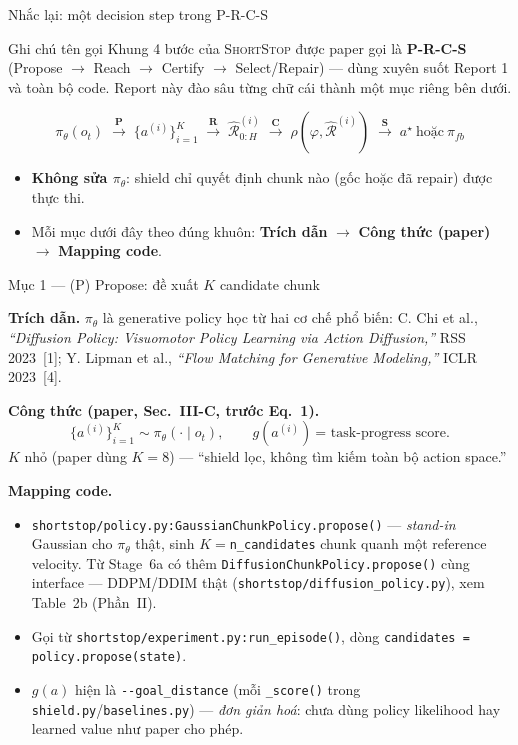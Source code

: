 \documentclass[aspectratio=169]{beamer}
\newcommand{\st}{\textsc{ShortStop}}
\begin{document}
\begin{frame}[t,shrink=8]{Nhắc lại: một decision step trong P-R-C-S}
\begin{block}{Ghi chú tên gọi}
Khung 4 bước của \st{} được paper gọi là \textbf{P-R-C-S} (Propose $\to$ Reach $\to$ Certify $\to$ Select/Repair) --- dùng xuyên suốt Report 1 và toàn bộ code. Report này đào sâu từng chữ cái thành một mục riêng bên dưới.
\end{block}
\vspace{4pt}
\begin{center}
\[
\pi_\theta(o_t)\;\xrightarrow{\textbf{P}}\;\{a^{(i)}\}_{i=1}^K\;\xrightarrow{\textbf{R}}\;\hat{\mathcal R}^{(i)}_{0:H}\;\xrightarrow{\textbf{C}}\;\rho(\varphi,\hat{\mathcal R}^{(i)})\;\xrightarrow{\textbf{S}}\;a^\star\ \text{hoặc}\ \pi_{fb}
\]
\end{center}
\vspace{4pt}
\begin{itemize}
    \item \textbf{Không sửa $\pi_\theta$}: shield chỉ quyết định chunk nào (gốc hoặc đã repair) được thực thi.
    \item Mỗi mục dưới đây theo đúng khuôn: \textbf{Trích dẫn} $\to$ \textbf{Công thức (paper)} $\to$ \textbf{Mapping code}.
\end{itemize}
\end{frame}

\begin{frame}[t,shrink=8]{Mục 1 --- (P) Propose: đề xuất $K$ candidate chunk}

\textbf{Trích dẫn.} $\pi_\theta$ là generative policy học từ hai cơ chế phổ biến:
C. Chi et al., \emph{``Diffusion Policy: Visuomotor Policy Learning via Action Diffusion,''} RSS 2023~[1]; Y. Lipman et al., \emph{``Flow Matching for Generative Modeling,''} ICLR 2023~[4].

\vspace{5pt}
\textbf{Công thức (paper, Sec.~III-C, trước Eq.~1).}
\[
\{a^{(i)}\}_{i=1}^{K}\sim\pi_\theta(\cdot\mid o_t),\qquad g(a^{(i)})\ \text{= task-progress score}.
\]
$K$ nhỏ (paper dùng $K=8$) --- ``shield lọc, không tìm kiếm toàn bộ action space.''

\vspace{5pt}
\textbf{Mapping code.}
\begin{itemize}
    \item \texttt{shortstop/policy.py:GaussianChunkPolicy.propose()} --- \emph{stand-in} Gaussian cho $\pi_\theta$ thật, sinh $K=$\texttt{n\_candidates} chunk quanh một reference velocity. Từ Stage~6a có thêm \texttt{DiffusionChunkPolicy.propose()} cùng interface --- DDPM/DDIM thật (\texttt{shortstop/diffusion\_policy.py}), xem Table~2b (Phần~II).
    \item Gọi từ \texttt{shortstop/experiment.py:run\_episode()}, dòng \texttt{candidates = policy.propose(state)}.
    \item $g(a)$ hiện là \texttt{-\/-goal\_distance} (mỗi \texttt{\_score()} trong \texttt{shield.py}/\texttt{baselines.py}) --- \emph{đơn giản hoá}: chưa dùng policy likelihood hay learned value như paper cho phép.
\end{itemize}
\end{frame}
\end{document}
